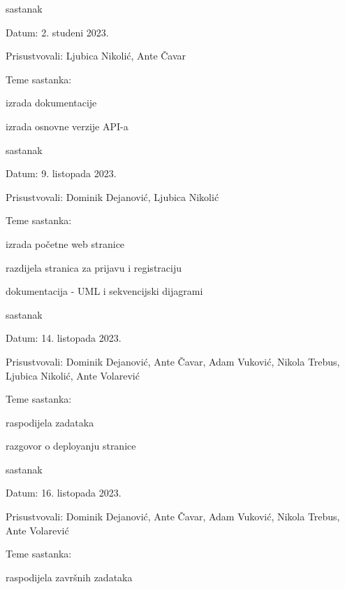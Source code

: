 \begin{packed_enum}
			
			\item  sastanak
			\item[] \begin{packed_item}
				\item Datum: 2. studeni 2023.
				\item Prisustvovali: Ljubica Nikolić, Ante Čavar
				\item Teme sastanka: 
				\begin{packed_item}
					\item izrada dokumentacije
					\item izrada osnovne verzije API-a
				\end{packed_item}
			\end{packed_item}
			
			\item  sastanak
			\item[] \begin{packed_item}
				\item Datum: 9. listopada 2023.
				\item Prisustvovali: Dominik Dejanović, Ljubica Nikolić
				\item Teme sastanka:
				\begin{packed_item}
					\item izrada početne web stranice
					\item razdijela stranica za prijavu i registraciju
					\item dokumentacija - UML i sekvencijski dijagrami
				\end{packed_item}
			\end{packed_item}
			
			\item  sastanak
			\item[] \begin{packed_item}
				\item Datum: 14. listopada 2023.
				\item Prisustvovali: Dominik Dejanović, Ante Čavar, Adam Vuković, Nikola Trebus, Ljubica Nikolić, Ante Volarević
				\item Teme sastanka:
				\begin{packed_item}
					\item raspodijela zadataka
					\item razgovor o deployanju stranice
				\end{packed_item}
			\end{packed_item}
			
			\item  sastanak
			\item[] \begin{packed_item}
				\item Datum: 16. listopada 2023.
				\item Prisustvovali: Dominik Dejanović, Ante Čavar, Adam Vuković, Nikola Trebus, Ante Volarević
				\item Teme sastanka:
				\begin{packed_item}
					\item raspodijela završnih zadataka
				\end{packed_item}
			\end{packed_item}
			

\end{packed_enum}
